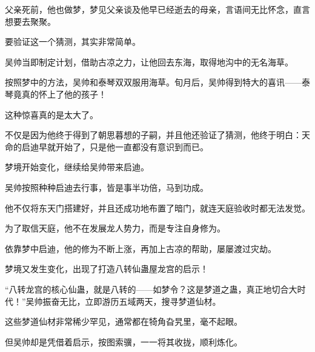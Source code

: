 \begin{this_body}
父亲死前，他也做梦，梦见父亲谈及他早已经逝去的母亲，言语间无比怀念，直言想要去聚聚。

要验证这一个猜测，其实非常简单。

吴帅当即制定计划，借助古凉之力，让他回去东海，取得地沟中的无名海草。

按照梦中的方法，吴帅和泰琴双双服用海草。旬月后，吴帅得到特大的喜讯——泰琴竟真的怀上了他的孩子！

这种惊喜真的是太大了。

不仅是因为他终于得到了朝思暮想的子嗣，并且他还验证了猜测，他终于明白：天命的启迪早就开始了，只是他一直都没有意识到而已。

梦境开始变化，继续给吴帅带来启迪。

吴帅按照种种启迪去行事，皆是事半功倍，马到功成。

他不仅将东天门搭建好，并且还成功地布置了暗门，就连天庭验收时都无法发觉。

为了取信天庭，他不在发展龙人势力，而是专注自身修为。

依靠梦中启迪，他的修为不断上涨，再加上古凉的帮助，屡屡渡过灾劫。

梦境又发生变化，出现了打造八转仙蛊屋龙宫的启示！

“八转龙宫的核心仙蛊，就是八转的——如梦令？这是梦道之蛊，真正地切合大时代！”吴帅振奋无比，立即游历五域两天，搜寻梦道仙材。

这些梦道仙材非常稀少罕见，通常都在犄角旮旯里，毫不起眼。

但吴帅却是凭借着启示，按图索骥，一一将其收拢，顺利炼化。

\end{this_body}

